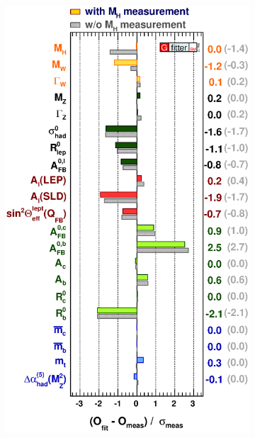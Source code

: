 \begin{figure}[t!]
  \centering
        \begin{subfigure}{0.39\textwidth}
  \includegraphics[width=\textwidth]{Theory/Figures/2013_05_29_PullPlotTwoBarsCol_logo.eps}
     \caption{}
  \label{fig:gfitter_pulls}
     \end{subfigure}
     \begin{subfigure}{0.6\textwidth}

\end{subfigure}
\end{figure}
